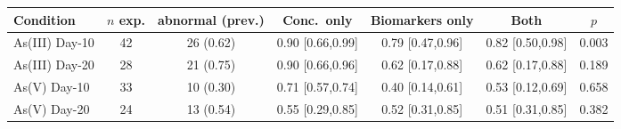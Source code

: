 \begin{tabular}{lcccccc}
  \toprule
  Condition & $n$ exp. & abnormal (prev.) & Conc.\ only & Biomarkers only & Both & $p$ \\
  \midrule
  As(III) Day-10 & 42 & 26 (0.62) & 0.90 [0.66,0.99] & 0.79 [0.47,0.96] & 0.82 [0.50,0.98] & 0.003 \\
  As(III) Day-20 & 28 & 21 (0.75) & 0.90 [0.66,0.96] & 0.62 [0.17,0.88] & 0.62 [0.17,0.88] & 0.189 \\
  As(V) Day-10 & 33 & 10 (0.30) & 0.71 [0.57,0.74] & 0.40 [0.14,0.61] & 0.53 [0.12,0.69] & 0.658 \\
  As(V) Day-20 & 24 & 13 (0.54) & 0.55 [0.29,0.85] & 0.52 [0.31,0.85] & 0.51 [0.31,0.85] & 0.382 \\
  \bottomrule
\end{tabular}
